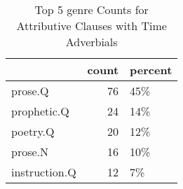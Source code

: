 \begin{table}[htbp!]
\centering
\caption{Top 5 genre Counts for Attributive Clauses with Time Adverbials}
\label{table:submod_genre}
\begin{tabular}{lrl}
\toprule
{} &  count & percent \\
\midrule
prose.Q       &     76 &     45\% \\
prophetic.Q   &     24 &     14\% \\
poetry.Q      &     20 &     12\% \\
prose.N       &     16 &     10\% \\
instruction.Q &     12 &      7\% \\
\bottomrule
\end{tabular}
\end{table}
